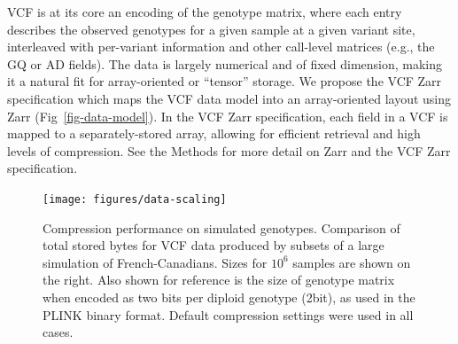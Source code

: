 \documentclass[a4paper,num-refs]{oup-contemporary}
\begin{document}
VCF is at its core an encoding of the genotype matrix, where each entry
describes the observed genotypes for a given sample at a given variant site,
interleaved with per-variant information
and other call-level matrices (e.g., the GQ or AD fields).
The data is largely numerical and of fixed dimension,
making it a natural fit for array-oriented or ``tensor'' storage.
We propose the VCF Zarr specification which maps the
VCF data model into an array-oriented layout using Zarr
(Fig~\ref{fig-data-model}).
In the VCF Zarr specification,
each field in a VCF is mapped to a separately-stored array,
allowing for efficient retrieval and
high levels of compression.
See the Methods for more detail on Zarr and the VCF Zarr
specification.

\begin{figure}
\begin{center}
\texttt{[image: figures/data-scaling]}
\end{center}
\caption{Compression performance on simulated genotypes.
Comparison of total stored bytes for VCF data produced
by subsets of a large simulation of French-Canadians.
Sizes for $10^6$ samples are shown on the right.
Also shown for reference is the size of genotype matrix
when encoded as two bits per diploid genotype (2bit), as used
in the PLINK binary format. Default compression settings were
used in all cases.
\label{fig-data-storage}}
\end{figure}
\end{document}
